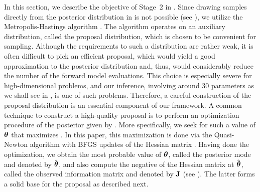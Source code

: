 In this section, we describe the objective of Stage~2 in .
Since drawing samples directly from the posterior distribution in  is not possible (see ), we utilize the Metropolis-Hastings algorithm \cite{gelman2004}.
The algorithm operates on an auxiliary distribution, called the proposal distribution, which is chosen to be convenient for sampling.
Although the requirements to such a distribution are rather weak, it is often difficult to pick an efficient proposal, which would yield a good approximation to the posterior distribution and, thus, would considerably reduce the number of the forward model evaluations.
This choice is especially severe for high-dimensional problems, and our inference, involving around 30 parameters as we shall see in , is one of such problems.
Therefore, a careful construction of the proposal distribution is an essential component of our framework.
A common technique to construct a high-quality proposal is to perform an optimization procedure of the posterior given by .
More specifically, we seek for such a value of ${\boldsymbol\theta}$ that maximizes . In this paper, this maximization is done via the Quasi-Newton algorithm with BFGS updates of the Hessian matrix \cite{press2007}.
Having done the optimization, we obtain the most probable value of ${\boldsymbol\theta}$, called the posterior mode and denoted by $\hat{{\boldsymbol\theta}}$, and also compute the negative of the Hessian matrix at $\hat{{\boldsymbol\theta}}$, called the observed information matrix and denoted by $\mathbf{J}$ (see ).
The latter forms a solid base for the proposal as described next.
